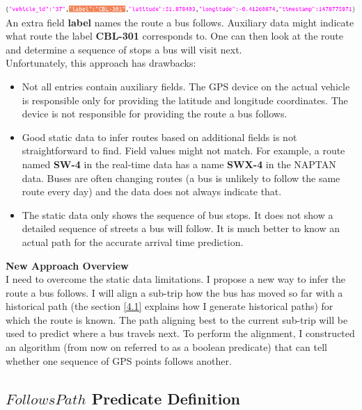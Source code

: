 \documentclass[12pt,a4paper,oneside,openright]{report}
\begin{document}
\includegraphics[width=\textwidth, scale=1.2]{figs/labelled_entry.png} \\

An extra field \textbf{label} names the route a bus follows. Auxiliary
data might indicate what route the label \textbf{CBL-301} corresponds to.
One can then look at the route and determine a sequence of stops 
a bus will visit next. \\

Unfortunately, this approach has drawbacks:

\begin{itemize}
\item Not all entries contain auxiliary fields. The GPS device on the
actual vehicle is responsible only for providing the latitude and longitude
coordinates. The device is not responsible for providing the route a bus follows.

\item Good static data to infer routes based on additional fields is not 
straightforward to find. Field values might not match. For example, a route
named \textbf{SW-4} in the real-time data has a name \textbf{SWX-4} in the
NAPTAN data.
Buses are often changing routes (a bus is unlikely to follow the same route
every day) and the data does not always indicate that.

\item The static data only shows the sequence of bus stops. It does not show a detailed
sequence of streets a bus will follow. It is much better to know an actual
path for the accurate arrival time prediction.
\end{itemize}

\textbf{New Approach Overview} \\

I need to overcome the static data limitations. I propose a new way to infer the
route a bus follows. I will align a sub-trip how the bus has moved
so far with a historical path (the section \textcolor{blue}{\ref{4.1}} explains how I generate historical paths)
for which the route is known. The path aligning
best to the current sub-trip will be used to predict where a bus travels next.
To perform the alignment, I constructed an algorithm (from now on referred
to as a boolean predicate) that can tell whether one sequence of GPS points 
follows another.

\subsection{$FollowsPath$ Predicate Definition}
\end{document}
